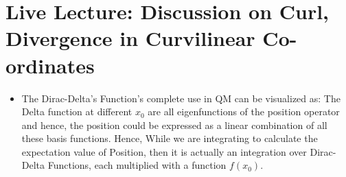\documentclass{article}
\begin{document}
\section{Live Lecture: Discussion on Curl, Divergence in Curvilinear Co-ordinates}

\begin{itemize}
  \item The Dirac-Delta's Function's complete use in QM can be visualized as: The Delta function at different $x_0$ are all eigenfunctions of the position operator and hence, the position could be expressed as a linear combination of all these basis functions. Hence, While we are integrating to calculate the expectation value of Position, then it is actually an integration over Dirac-Delta Functions, each multiplied with a function $f(x_0)$.

\end{itemize}
\end{document}
